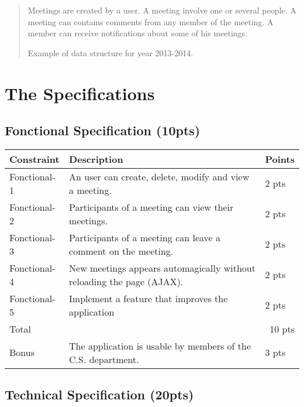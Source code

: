 \documentclass{article}         %
\newcounter{notetab}
\newcommand{\zero}{\setcounter{notetab}{0}}
\begin{document}
\begin{quotation}
Meetings are created by a user. A meeting involve one or several people. A meeting can contains comments from any member of the meeting. A member can receive notifications about some of his meetings.\par
\raggedleft Example of data structure for year 2013-2014.
\end{quotation}



\section{The Specifications}
\label{specs}

\subsection{Fonctional Specification (10pts)}

\zero
\begin{tabular}{|p{2cm}|p{10cm}|p{1cm}|}
  \hline
  Constraint & Description & Points \\

  \hline
  Fonctional-1 & An user can create, delete, modify and view a meeting. & 2 pts \\
  Fonctional-2 & Participants of a meeting can view their meetings. & 2 pts \\
  Fonctional-3 & Participants of a meeting can leave a comment on the meeting. & 2 pts \\
  Fonctional-4 & New meetings appears automagically without reloading the page (AJAX). & 2 pts \\
  Fonctional-5 & Implement a feature that improves the application & 2 pts \\
  \hline
  Total & \multicolumn{2}{r|}{   10 pts \hspace{1 mm}} \\
  \hline
  Bonus & The application is usable by members of the C.S. department. & 3 pts \\

  \hline
\end{tabular}


\subsection{Technical Specification (20pts)}
\end{document}
